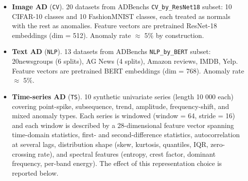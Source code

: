 \documentclass[3p,twocolumn]{elsarticle}
\begin{document}
\begin{itemize}
\tightlist
\item
  \textbf{Image AD} (\texttt{CV}). 20 datasets from ADBench\textquotesingle s \texttt{CV\_by\_ResNet18} subset: 10 CIFAR-10 classes and 10 FashionMNIST classes, each treated as normals with the rest as anomalies. Feature vectors are pretrained ResNet-18 embeddings (dim = 512). Anomaly rate $\approx$ 5\% by construction.
\item
  \textbf{Text AD} (\texttt{NLP}). 13 datasets from ADBench\textquotesingle s \texttt{NLP\_by\_BERT} subset: 20newsgroups (6 splits), AG News (4 splits), Amazon reviews, IMDB, Yelp. Feature vectors are pretrained BERT embeddings (dim = 768). Anomaly rate $\approx$ 5\%.
\item
  \textbf{Time-series AD} (\texttt{TS}). 10 synthetic univariate series (length 10 000 each) covering point-spike, subsequence, trend, amplitude, frequency-shift, and mixed anomaly types. Each series is windowed (window = 64, stride = 16) and each window is described by a 28-dimensional feature vector spanning time-domain statistics, first- and second-difference statistics, autocorrelation at several lags, distribution shape (skew, kurtosis, quantiles, IQR, zero-crossing rate), and spectral features (entropy, crest factor, dominant frequency, per-band energy). The effect of this representation choice is reported below.
\end{itemize}
\end{document}
